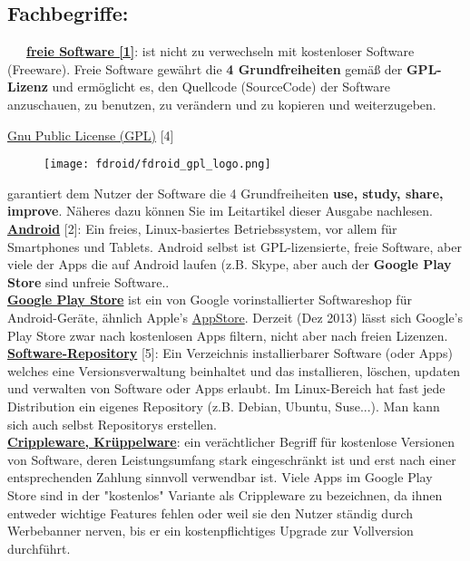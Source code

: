 \subsection*{Fachbegriffe:}

~~~\href{http://de.wikipedia.org/wiki/Freie_Software}{\textbf{freie Software [1]}}: ist nicht zu verwechseln mit kostenloser Software (Freeware). Freie Software gewährt die \textbf{4 Grundfreiheiten} gemäß der \textbf{GPL-Lizenz} und ermöglicht es, den Quellcode (SourceCode) der Software anzuschauen, zu benutzen, zu verändern und zu kopieren und weiterzugeben.

\href{http://de.wikipedia.org/wiki/GNU_General_Public_License}{Gnu Public License (GPL)} [4]
\begin{figure}
\texttt{[image: fdroid/fdroid\_gpl\_logo.png]}
\end{figure}
garantiert dem Nutzer der Software die 4 Grundfreiheiten \textbf{use, study, share, improve}. Näheres dazu können Sie im Leitartikel dieser Ausgabe nachlesen. \\

\href{http://www.android.com/}{\textbf{Android}} [2]: Ein freies, Linux-basiertes Betriebssystem, vor allem für Smartphones und Tablets. Android selbst ist GPL-lizensierte, freie Software, aber viele der Apps die auf Android laufen (z.B. Skype, aber auch der \textbf{Google Play Store} sind unfreie Software.. \\

\href{http://de.wikipedia.org/wiki/Google_Play}{\textbf{Google Play Store}} ist ein von Google vorinstallierter Softwareshop für Android-Geräte, ähnlich Apple's \href{http://de.wikipedia.org/wiki/AppStore}{AppStore}. Derzeit (Dez 2013) lässt sich Google's Play Store zwar nach kostenlosen Apps filtern, nicht aber nach freien Lizenzen. \\

\href{http://de.wikipedia.org/wiki/Repository}{\textbf{Software-Repository}} [5]: Ein Verzeichnis installierbarer Software (oder Apps) welches eine Versionsverwaltung beinhaltet und das installieren, löschen, updaten und verwalten von Software oder Apps erlaubt. Im Linux-Bereich hat fast jede Distribution ein eigenes Repository (z.B. Debian, Ubuntu, Suse...). Man kann sich auch selbst Repositorys erstellen. \\

\href{http://de.wikipedia.org/wiki/Crippleware}{\textbf{Crippleware, Krüppelware}}: ein verächtlicher Begriff für kostenlose Versionen von Software, deren Leistungsumfang stark eingeschränkt ist und erst nach einer entsprechenden Zahlung sinnvoll verwendbar ist. Viele Apps im Google Play Store sind in der "kostenlos" Variante als Crippleware zu bezeichnen, da ihnen entweder wichtige Features fehlen oder weil sie den Nutzer ständig durch Werbebanner nerven, bis er ein kostenpflichtiges Upgrade zur Vollversion durchführt.

